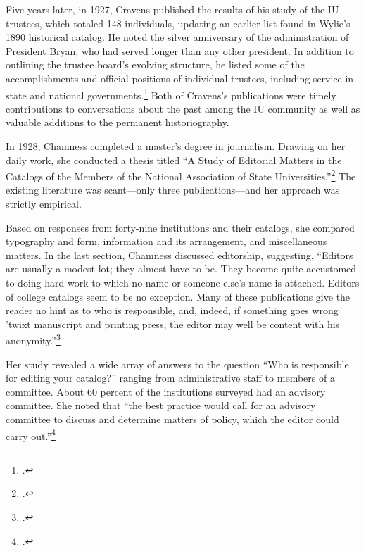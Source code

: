 \documentclass[
  american,
  letterpaper,
]{scrreprt}
\begin{document}
Five years later, in 1927, Cravens published the results of his study of
the IU trustees, which totaled 148 individuals, updating an earlier list
found in Wylie's 1890 historical catalog. He noted the silver
anniversary of the administration of President Bryan, who had served
longer than any other president. In addition to outlining the trustee
board's evolving structure, he listed some of the accomplishments and
official positions of individual trustees, including service in state
and national governments.\footnote{.} Both of Cravens's publications were
timely contributions to conversations about the past among the IU
community as well as valuable additions to the permanent historiography.

In 1928, Chamness completed a master's degree in journalism. Drawing on
her daily work, she conducted a thesis titled ``A Study of Editorial
Matters in the Catalogs of the Members of the National Association of
State Universities.''\footnote{.} The existing literature was
scant---only three publications---and her approach was strictly
empirical.

Based on responses from forty-nine institutions and their catalogs, she
compared typography and form, information and its arrangement, and
miscellaneous matters. In the last section, Chamness discussed
editorship, suggesting, ``Editors are usually a modest lot; they almost
have to be. They become quite accustomed to doing hard work to which no
name or someone else's name is attached. Editors of college catalogs
seem to be no exception. Many of these publications give the reader no
hint as to who is responsible, and, indeed, if something goes wrong
'twixt manuscript and printing press, the editor may well be content
with his anonymity.''\footnote{.}

Her study revealed a wide array of answers to the question ``Who is
responsible for editing your catalog?'' ranging from administrative
staff to members of a committee. About 60 percent of the institutions
surveyed had an advisory committee. She noted that ``the best practice
would call for an advisory committee to discuss and determine matters of
policy, which the editor could carry out.''\footnote{.}
\end{document}
